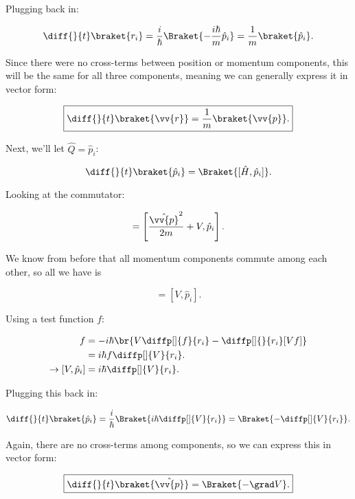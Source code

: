 \begin{parts}
Plugging back in:

\begin{equation}
    \diff{}{t}\braket{r_i} = \frac{i}{\hbar}\Braket{-\frac{i\hbar}{m}\hat{p}_i} = \frac{1}{m}\braket{\hat{p}_i}.
\end{equation}

Since there were no cross-terms between position or momentum components, this will be the same for all three components, meaning we can generally express it in vector form:

\begin{equation}
    \boxed{\diff{}{t}\braket{\vv{r}} = \frac{1}{m}\braket{\vv{p}}.}
\end{equation}

Next, we'll let $\hat{Q} = \hat{p}_i$:

\begin{equation}
    \diff{}{t}\braket{\hat{p}_i} = \Braket{[\hat{H},\hat{p}_i]}.
\end{equation}

Looking at the commutator:

\begin{equation}
    [\hat{H},\hat{p}_i] = \left[ \frac{\hat{\vv{p}}^2}{2m} + V, \hat{p}_i \right].
\end{equation}

We know from before that all momentum components commute among each other, so all we have is

\begin{equation}
    = [V,\hat{p}_i].
\end{equation}

Using a test function $f$:

\begin{align}
    [V,\hat{p}_i]f &= -i\hbar\br{V\diffp[]{f}{r_i} - \diffp[]{}{r_i}[Vf]} \\
    &= i\hbar f \diffp[]{V}{r_i}. \\
    \rightarrow [V,\hat{p}_i] &= i\hbar \diffp[]{V}{r_i}.
\end{align}

Plugging this back in:

\begin{equation}
    \diff{}{t}\braket{\hat{p}_i} = \frac{i}{\hbar}\Braket{i\hbar \diffp[]{V}{r_i}} = \Braket{-\diffp[]{V}{r_i}}.
\end{equation}

Again, there are no cross-terms among components, so we can express this in vector form:

\begin{equation}
    \boxed{\diff{}{t}\braket{\hat{\vv{p}}} = \Braket{-\grad V}.}
\end{equation}






\end{parts}

